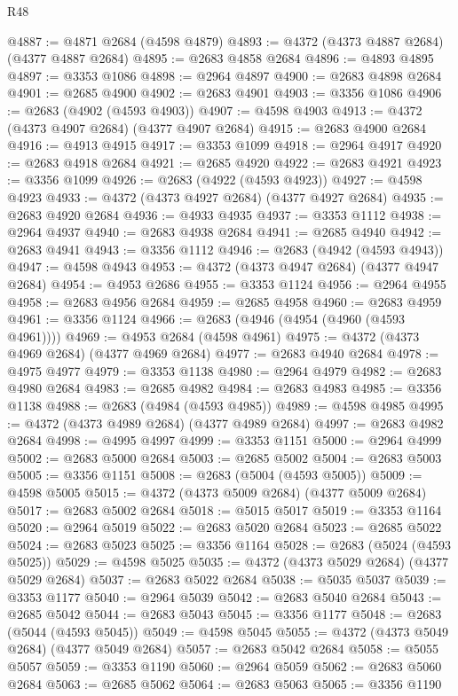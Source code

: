 \begin{lexlean}{R48}
\begin{coremodule}
@4887 := @4871 @2684 (@4598 @4879)
@4893 := @4372 (@4373 @4887 @2684) (@4377 @4887 @2684)
@4895 := @2683 @4858 @2684
@4896 := @4893 @4895
@4897 := @3353 @1086
@4898 := @2964 @4897
@4900 := @2683 @4898 @2684
@4901 := @2685 @4900
@4902 := @2683 @4901
@4903 := @3356 @1086
@4906 := @2683 (@4902 (@4593 @4903))
@4907 := @4598 @4903
@4913 := @4372 (@4373 @4907 @2684) (@4377 @4907 @2684)
@4915 := @2683 @4900 @2684
@4916 := @4913 @4915
@4917 := @3353 @1099
@4918 := @2964 @4917
@4920 := @2683 @4918 @2684
@4921 := @2685 @4920
@4922 := @2683 @4921
@4923 := @3356 @1099
@4926 := @2683 (@4922 (@4593 @4923))
@4927 := @4598 @4923
@4933 := @4372 (@4373 @4927 @2684) (@4377 @4927 @2684)
@4935 := @2683 @4920 @2684
@4936 := @4933 @4935
@4937 := @3353 @1112
@4938 := @2964 @4937
@4940 := @2683 @4938 @2684
@4941 := @2685 @4940
@4942 := @2683 @4941
@4943 := @3356 @1112
@4946 := @2683 (@4942 (@4593 @4943))
@4947 := @4598 @4943
@4953 := @4372 (@4373 @4947 @2684) (@4377 @4947 @2684)
@4954 := @4953 @2686
@4955 := @3353 @1124
@4956 := @2964 @4955
@4958 := @2683 @4956 @2684
@4959 := @2685 @4958
@4960 := @2683 @4959
@4961 := @3356 @1124
@4966 := @2683 (@4946 (@4954 (@4960 (@4593 @4961))))
@4969 := @4953 @2684 (@4598 @4961)
@4975 := @4372 (@4373 @4969 @2684) (@4377 @4969 @2684)
@4977 := @2683 @4940 @2684
@4978 := @4975 @4977
@4979 := @3353 @1138
@4980 := @2964 @4979
@4982 := @2683 @4980 @2684
@4983 := @2685 @4982
@4984 := @2683 @4983
@4985 := @3356 @1138
@4988 := @2683 (@4984 (@4593 @4985))
@4989 := @4598 @4985
@4995 := @4372 (@4373 @4989 @2684) (@4377 @4989 @2684)
@4997 := @2683 @4982 @2684
@4998 := @4995 @4997
@4999 := @3353 @1151
@5000 := @2964 @4999
@5002 := @2683 @5000 @2684
@5003 := @2685 @5002
@5004 := @2683 @5003
@5005 := @3356 @1151
@5008 := @2683 (@5004 (@4593 @5005))
@5009 := @4598 @5005
@5015 := @4372 (@4373 @5009 @2684) (@4377 @5009 @2684)
@5017 := @2683 @5002 @2684
@5018 := @5015 @5017
@5019 := @3353 @1164
@5020 := @2964 @5019
@5022 := @2683 @5020 @2684
@5023 := @2685 @5022
@5024 := @2683 @5023
@5025 := @3356 @1164
@5028 := @2683 (@5024 (@4593 @5025))
@5029 := @4598 @5025
@5035 := @4372 (@4373 @5029 @2684) (@4377 @5029 @2684)
@5037 := @2683 @5022 @2684
@5038 := @5035 @5037
@5039 := @3353 @1177
@5040 := @2964 @5039
@5042 := @2683 @5040 @2684
@5043 := @2685 @5042
@5044 := @2683 @5043
@5045 := @3356 @1177
@5048 := @2683 (@5044 (@4593 @5045))
@5049 := @4598 @5045
@5055 := @4372 (@4373 @5049 @2684) (@4377 @5049 @2684)
@5057 := @2683 @5042 @2684
@5058 := @5055 @5057
@5059 := @3353 @1190
@5060 := @2964 @5059
@5062 := @2683 @5060 @2684
@5063 := @2685 @5062
@5064 := @2683 @5063
@5065 := @3356 @1190

\end{coremodule}
\end{lexlean}
